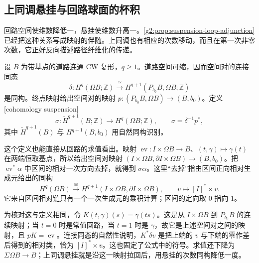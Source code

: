\subsection{上同调悬挂与回路球面的杯积}
\label{g2:subsec:1103:04}
回路空间使维数降低一，悬挂使维数升高一。\cref{g2:prop:suspension-loop-adjunction}已经把这种关系写成映射的伴随。上同调也有相应的次数移动，而且在第一次非零次数，它正好反向描述路径纤维化的传递。

\begin{definition}[上同调悬挂]\label{g2:def:cohomology-suspension}
	设 \(B\) 为带基点的道路连通 CW 复形，\(q\ge1\)。道路空间可缩，因而空间对的连接同态
	\[
		\delta:H^q(\Omega B;\mathbb Z)\xrightarrow{\cong}H^{q+1}(P_{b_0}B,\Omega B;\mathbb Z)
	\]
	是同构。终点映射给出空间对的映射 \(p:(P_{b_0}B,\Omega B)\to(B,b_0)\)。定义[cohomology suspension]
	\[
		\sigma:\widetilde H^{q+1}(B;\mathbb Z)\longrightarrow H^q(\Omega B;\mathbb Z),\qquad \sigma=\delta^{-1}p^*,
	\]
	其中 \(\widetilde H^{q+1}(B)\) 与 \(H^{q+1}(B,b_0)\) 用自然同构识别。
\end{definition}

这个定义也能直接从回路的求值看出。映射 \(\operatorname{ev}:I\times\Omega B\to B\)、\((t,\gamma)\mapsto\gamma(t)\) 在两端恒取基点，所以给出空间对映射 \((I\times\Omega B,\partial I\times\Omega B)\to(B,b_0)\)。把 \(\operatorname{ev}^*\alpha\) 中区间的相对一次方向去掉，就得到 \(\sigma\alpha\)。这里“去掉”指由区间正向相对生成元给出的同构
\[
	H^q(\Omega B)\xrightarrow{\cong}H^{q+1}(I\times\Omega B,\partial I\times\Omega B),\qquad v\longmapsto[I]^*\times v.
\]
它来自区间相对链只有一个一次生成元的乘积计算；区间的定向取 \(0\) 指向 \(1\)。

\ProseParagraphBreak

为核对这与定义相同，令 \(K(t,\gamma)(s)=\gamma(ts)\)。这是从 \(I\times\Omega B\) 到 \(P_{b_0}B\) 的连续映射；当 \(t=0\) 时是常值回路，当 \(t=1\) 时是 \(\gamma\)，故它是上述空间对之间的映射，且 \(pK=\operatorname{ev}\)。连接同态的自然性说明，\(K^*\delta v\) 是把上端的 \(v\) 与下端的零作差后得到的相对类，恰为 \([I]^*\times v\)。这也固定了公式中的符号。求值还下降为 \(\Sigma\Omega B\to B\)；上同调悬挂就是沿这一映射拉回后，用悬挂的次数同构降低一度。

